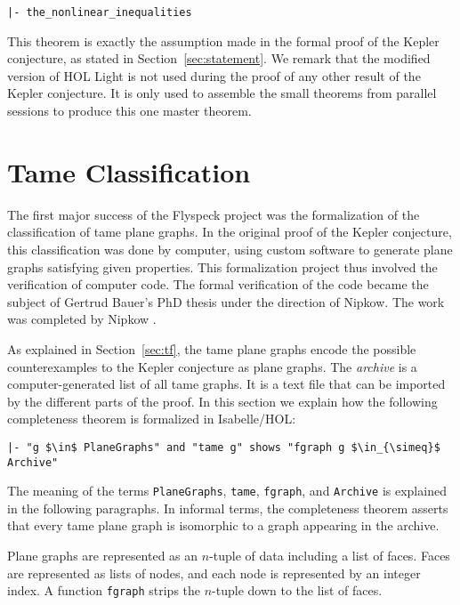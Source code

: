 \begin{verbatim}
|- the_nonlinear_inequalities
\end{verbatim}

This theorem is exactly the assumption made in the formal proof of the
Kepler conjecture, as stated in Section~\ref{sec:statement}.  We
remark that the modified version of HOL Light is not used during the
proof of any other result of the Kepler conjecture.  It is only used
to assemble the small theorems from parallel sessions to produce this
one master theorem.

\section{Tame Classification}\label{sec:tc}


The first major success of the Flyspeck project was the formalization
of the classification of tame plane graphs. In the original proof of
the Kepler conjecture, this classification was done by computer, using
custom software to generate plane graphs satisfying given
properties. This formalization project thus involved the verification
of computer code. The formal verification of the code became the
subject of Gertrud Bauer's PhD thesis under the direction of
Nipkow. The work was completed by Nipkow \cite{NipkowBS-IJCAR06}.

As explained in Section~\ref{sec:tf}, the tame plane graphs encode
the possible counterexamples to the Kepler conjecture as plane
graphs. The {\it archive} is a computer-generated list of all tame
graphs. It is a text file that can be imported by the different parts
of the proof. In this section we explain how the following
completeness theorem is formalized in Isabelle/HOL:

\begin{lstlisting}[keepspaces=true,stringstyle=\tt,basicstyle=\small,%
frame=none,framesep=8pt,mathescape,morekeywords={and,shows},columns=flexible]
|- "g $\in$ PlaneGraphs" and "tame g" shows "fgraph g $\in_{\simeq}$ Archive"
\end{lstlisting}

The meaning of the
terms \verb!PlaneGraphs!, \verb!tame!, \verb!fgraph!, and
\verb!Archive! is explained in the following paragraphs.
In informal terms, the completeness theorem 
asserts that every tame plane graph is
isomorphic to a graph appearing in the archive.  

Plane graphs are represented as an
$n$-tuple of data including a list of faces. Faces are represented
as lists of nodes, and each node is represented by an integer index.
A function \verb!fgraph! strips the $n$-tuple down to the list of faces.

